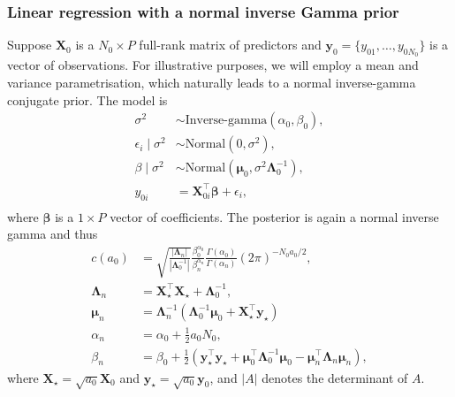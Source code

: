 \documentclass[a4paper, notitlepage, 11pt]{article}
\begin{document}
\subsubsection*{Linear regression with a normal inverse Gamma prior}

Suppose $\boldsymbol X_0$ is a $N_0 \times P$ full-rank matrix of predictors and $\boldsymbol y_0 = \{y_{01}, \ldots, y_{0N_0} \}$ is a vector of observations.
For illustrative purposes, we will employ a mean and variance parametrisation, which naturally leads to a normal inverse-gamma conjugate prior.
The model is 
\begin{align*}
 \sigma^2 &\sim \text{Inverse-gamma}(\alpha_0, \beta_0),\\
 \epsilon_i \mid \sigma^2  &\sim \text{Normal}(0, \sigma^2), \\
 \beta \mid \sigma^2 &\sim \text{Normal}(\boldsymbol \mu_0, \sigma^2\boldsymbol\Lambda_0^{-1}),\\
 y_{0i} &= \boldsymbol X_{0i}^\top \boldsymbol\beta + \epsilon_i, \\
\end{align*} 
where $\boldsymbol\beta$ is a $ 1 \times P$ vector of coefficients.
The posterior is again a normal inverse gamma and thus
\begin{align}
 \label{eq:cA0_regression}
c(a_0) &= \sqrt{\frac{|\boldsymbol\Lambda_n|}{|\boldsymbol\Lambda_0^{-1}|}} \frac{\beta_0^{\alpha_0}}{\beta_n^{\alpha_n}}\frac{\Gamma(\alpha_0)}{\Gamma(\alpha_n)}  (2\pi)^{-N_0 a_0/2},\\
\boldsymbol\Lambda_n &= \boldsymbol X_{\star}^\top\boldsymbol X_{\star} + \boldsymbol \Lambda_0^{-1}, \\
\boldsymbol\mu_n &= \boldsymbol\Lambda_n^{-1}\left(\boldsymbol\Lambda_0^{-1}\boldsymbol\mu_0 + \boldsymbol X_{\star}^\top\boldsymbol y_{\star} \right)  \\
\alpha_n &= \alpha_0 + \frac{1}{2}a_0N_0,\\
\beta_n &= \beta_0 + \frac{1}{2}\left( \boldsymbol y_{\star}^\top \boldsymbol y_{\star} + \boldsymbol \mu_0^\top \boldsymbol \Lambda_0^{-1} \boldsymbol \mu_0 - \boldsymbol\mu_n^\top \boldsymbol \Lambda_n \boldsymbol \mu_n  \right),
\end{align}
where $\boldsymbol X_{\star} = \sqrt{a_0} \boldsymbol X_0$ and $\boldsymbol y_{\star} = \sqrt{a_0} \boldsymbol y_0$, and $|A|$ denotes the determinant of $A$.
\end{document}
